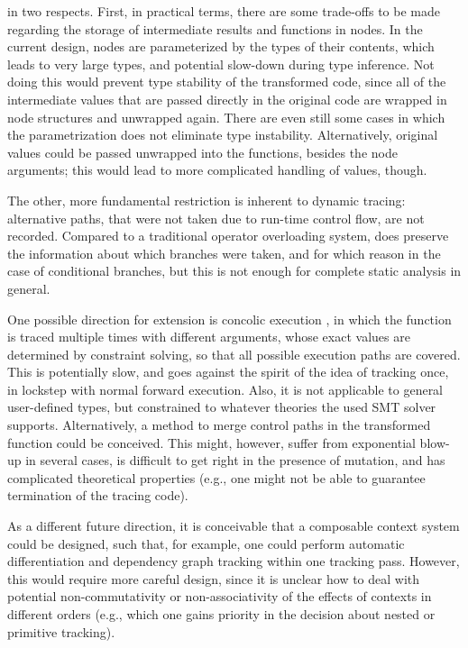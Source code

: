 
 in two respects.  First, in practical terms, there are
some trade-offs to be made regarding the storage of intermediate results and functions in nodes.  In
the current design, nodes are parameterized by the types of their contents, which leads to very
large types, and potential slow-down during type inference.  Not doing this would prevent type
stability of the transformed code, since all of the intermediate values that are passed directly in
the original code are wrapped in node structures and unwrapped again.  There are even still some
cases in which the parametrization does not eliminate type instability.  Alternatively, original
values could be passed unwrapped into the  functions, besides the node arguments;
this would lead to more complicated handling of values, though.

The other, more fundamental restriction is inherent to dynamic tracing: alternative paths, that were
not taken due to run-time control flow, are not recorded.  Compared to a traditional operator
overloading system, \irtrackerjl{} does preserve the information about which branches were taken,
and for which reason in the case of conditional branches, but this is not enough for complete static
analysis in general.

One possible direction for extension is concolic execution \parencite{zeller2019concolic}, in which
the function is traced multiple times with different arguments, whose exact values are determined by
constraint solving, so that all possible execution paths are covered.  This is potentially slow, and
goes against the spirit of the idea of tracking once, in lockstep with normal forward execution.
Also, it is not applicable to general user-defined types, but constrained to whatever theories the
used SMT solver supports.  Alternatively, a method to merge control paths in the transformed
function could be conceived.  This might, however, suffer from exponential blow-up in several cases,
is difficult to get right in the presence of mutation, and has complicated theoretical properties
(e.g., one might not be able to guarantee termination of the tracing code).

As a different future direction, it is conceivable that a composable context system could be
designed, such that, for example, one could perform automatic differentiation and dependency graph
tracking within one tracking pass.  However, this would require more careful design, since it is
unclear how to deal with potential non-commutativity or non-associativity of the effects of contexts
in different orders (e.g., which one gains priority in the decision about nested or primitive
tracking).


